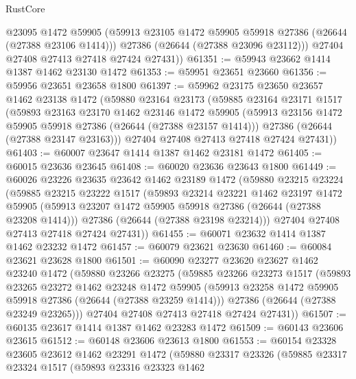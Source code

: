 \begin{lexlean}{RustCore}
\begin{coremodule}
          @23095
          @1472
          @59905
          (@59913 @23105 @1472 @59905 @59918 @27386 (@26644 (@27388 @23106 @1414)))
          @27386
          (@26644 (@27388 @23096 @23112)))
        @27404
        @27408
        @27413
        @27418
        @27424
        @27431))
@61351 := @59943 @23662 @1414 @1387 @1462 @23130 @1472
@61353 := @59951 @23651 @23660
@61356 := @59956 @23651 @23658 @1800
@61397 := @59962
    @23175
    @23650
    @23657
    @1462
    @23138
    @1472
    (@59880
      @23164
      @23173
      (@59885
        @23164
        @23171
        @1517
        (@59893
          @23163
          @23170
          @1462
          @23146
          @1472
          @59905
          (@59913 @23156 @1472 @59905 @59918 @27386 (@26644 (@27388 @23157 @1414)))
          @27386
          (@26644 (@27388 @23147 @23163)))
        @27404
        @27408
        @27413
        @27418
        @27424
        @27431))
@61403 := @60007 @23647 @1414 @1387 @1462 @23181 @1472
@61405 := @60015 @23636 @23645
@61408 := @60020 @23636 @23643 @1800
@61449 := @60026
    @23226
    @23635
    @23642
    @1462
    @23189
    @1472
    (@59880
      @23215
      @23224
      (@59885
        @23215
        @23222
        @1517
        (@59893
          @23214
          @23221
          @1462
          @23197
          @1472
          @59905
          (@59913 @23207 @1472 @59905 @59918 @27386 (@26644 (@27388 @23208 @1414)))
          @27386
          (@26644 (@27388 @23198 @23214)))
        @27404
        @27408
        @27413
        @27418
        @27424
        @27431))
@61455 := @60071 @23632 @1414 @1387 @1462 @23232 @1472
@61457 := @60079 @23621 @23630
@61460 := @60084 @23621 @23628 @1800
@61501 := @60090
    @23277
    @23620
    @23627
    @1462
    @23240
    @1472
    (@59880
      @23266
      @23275
      (@59885
        @23266
        @23273
        @1517
        (@59893
          @23265
          @23272
          @1462
          @23248
          @1472
          @59905
          (@59913 @23258 @1472 @59905 @59918 @27386 (@26644 (@27388 @23259 @1414)))
          @27386
          (@26644 (@27388 @23249 @23265)))
        @27404
        @27408
        @27413
        @27418
        @27424
        @27431))
@61507 := @60135 @23617 @1414 @1387 @1462 @23283 @1472
@61509 := @60143 @23606 @23615
@61512 := @60148 @23606 @23613 @1800
@61553 := @60154
    @23328
    @23605
    @23612
    @1462
    @23291
    @1472
    (@59880
      @23317
      @23326
      (@59885
        @23317
        @23324
        @1517
        (@59893
          @23316
          @23323
          @1462

\end{coremodule}
\end{lexlean}
